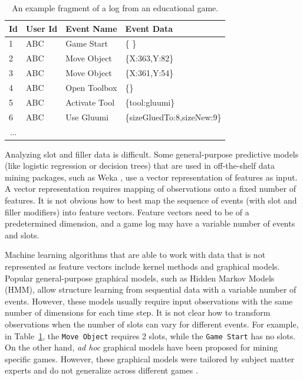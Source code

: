 \documentclass{sigchi}
\begin{document}
	\begin{table}[tbh]
		\begin{tabular}{@{}llll@{}}
			\toprule
			\textbf{Id}             & \textbf{User Id} & \textbf{Event Name} & \textbf{Event Data}        \\ \midrule
			1                       & ABC              & Game Start          & \{ \}                        \\
			2                       & ABC              & Move Object         & \{X:363,Y:82\} \\
			3                       & ABC              & Move Object         & \{X:361,Y:54\} \\
			4                       & ABC              & Open Toolbox        & \{\}        \\
			5                       & ABC              & Activate Tool        & \{tool:gluumi\}        \\
			6                       & ABC              & Use Gluumi        & \{sizeGluedTo:8,sizeNew:9\} \\        
			\multicolumn{1}{c}{...} &                  &                     &                            \\ \bottomrule
		\end{tabular}
		\caption{An example fragment of a log from an educational game. \label{tbl:log_example}}
	\end{table}
	
	Analyzing slot and filler data is difficult.
	Some general-purpose predictive models (like logistic regression or decision trees)  that are used in off-the-shelf data mining packages, such as Weka \cite{hall2009weka}, use a vector representation of features as input. 
	A vector representation requires mapping of observations onto a fixed number of features.
	It is not obvious how to best map the sequence of events (with slot and filler modifiers)  into feature vectors.
	Feature vectors need to be of a predetermined dimension, and a game log may have a variable number of events and slots.
	
	Machine learning algorithms that are able to work with data that is not represented as feature vectors include kernel methods and graphical models.
	Popular general-purpose graphical models, such as Hidden Markov Models (HMM), allow structure learning from sequential data with a variable number of events.
	However, these models usually require input observations with the same number of dimensions for each time step.
	It is not clear how to transform observations when the number of slots can vary for different events.
	For example, in Table~\ref{tbl:log_example}, the \texttt{Move Object} requires  2 slots, while the \texttt{Game Start} has no slots.
	On the other hand, \textit{ad hoc} graphical models have  been proposed for mining specific games.
	However, these graphical models were tailored by subject matter experts and do not generalize across different games \cite{rowe2010integrating}.
	
\end{document}

